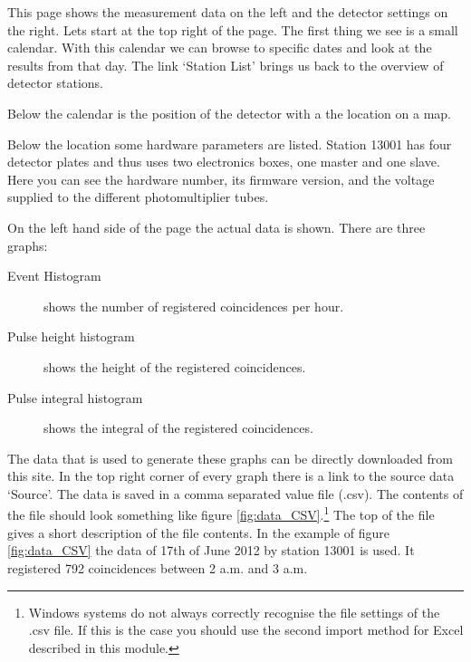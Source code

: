 \documentclass[12pt,a4paper]{article}
\numberwithin{equation}{section}
\numberwithin{figure}{section}
\numberwithin{table}{section}
\begin{document}
This page shows the measurement data on the left and the detector settings on the right. Lets start at the top right of the page. The first thing we see is a small calendar. With this calendar we can browse to specific dates and look at the results from that day. The link `Station List' brings us back to the overview of detector stations.

Below the calendar is the position of the detector with a the location on a map.

Below the location some hardware parameters are listed. Station 13001 has four detector plates and thus uses two electronics boxes, one master and one slave. Here you can see the hardware number, its firmware version, and the voltage supplied to the different photomultiplier tubes.

On the left hand side of the page the actual data is shown. There are three graphs:
\begin{description}
\item[Event Histogram] shows the number of registered coincidences per hour.
\item[Pulse height histogram] shows the height of the registered coincidences.
\item[Pulse integral histogram] shows the integral of the registered coincidences.
\end{description}

The data that is used to generate these graphs can be directly downloaded from this site. In the top right corner of every graph there is a link to the source data `Source'. The data is saved in a comma separated value file (.csv). The contents of the file should look something like figure \ref{fig:data_CSV}.\footnote{Windows systems do not always correctly recognise the file settings of the .csv file. If this is the case you should use the second import method for Excel described in this module.} The top of the file gives a short description of the file contents. In the example of figure \ref{fig:data_CSV} the data of 17th of June 2012 by station 13001 is used. It registered 792 coincidences between 2 a.m. and 3 a.m.
\end{document}
